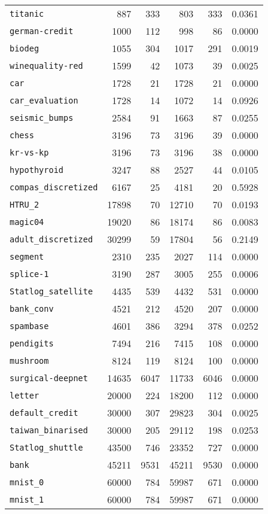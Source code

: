 \begin{tabular}{lrrrrr}
\texttt{titanic}& 887& 333& 803& 333& 0.0361\\
\texttt{german-credit}& 1000& 112& 998& 86& 0.0000\\
\texttt{biodeg}& 1055& 304& 1017& 291& 0.0019\\
\texttt{winequality-red}& 1599& 42& 1073& 39& 0.0025\\
\texttt{car}& 1728& 21& 1728& 21& 0.0000\\
\texttt{car\_evaluation}& 1728& 14& 1072& 14& 0.0926\\
\texttt{seismic\_bumps}& 2584& 91& 1663& 87& 0.0255\\
\texttt{chess}& 3196& 73& 3196& 39& 0.0000\\
\texttt{kr-vs-kp}& 3196& 73& 3196& 38& 0.0000\\
\texttt{hypothyroid}& 3247& 88& 2527& 44& 0.0105\\
\texttt{compas\_discretized}& 6167& 25& 4181& 20& 0.5928\\
\texttt{HTRU\_2}& 17898& 70& 12710& 70& 0.0193\\
\texttt{magic04}& 19020& 86& 18174& 86& 0.0083\\
\texttt{adult\_discretized}& 30299& 59& 17804& 56& 0.2149\\
\texttt{segment}& 2310& 235& 2027& 114& 0.0000\\
\texttt{splice-1}& 3190& 287& 3005& 255& 0.0006\\
\texttt{Statlog\_satellite}& 4435& 539& 4432& 531& 0.0000\\
\texttt{bank\_conv}& 4521& 212& 4520& 207& 0.0000\\
\texttt{spambase}& 4601& 386& 3294& 378& 0.0252\\
\texttt{pendigits}& 7494& 216& 7415& 108& 0.0000\\
\texttt{mushroom}& 8124& 119& 8124& 100& 0.0000\\
\texttt{surgical-deepnet}& 14635& 6047& 11733& 6046& 0.0000\\
\texttt{letter}& 20000& 224& 18200& 112& 0.0000\\
\texttt{default\_credit}& 30000& 307& 29823& 304& 0.0025\\
\texttt{taiwan\_binarised}& 30000& 205& 29112& 198& 0.0253\\
\texttt{Statlog\_shuttle}& 43500& 746& 23352& 727& 0.0000\\
\texttt{bank}& 45211& 9531& 45211& 9530& 0.0000\\
\texttt{mnist\_0}& 60000& 784& 59987& 671& 0.0000\\
\texttt{mnist\_1}& 60000& 784& 59987& 671& 0.0000\\

\end{tabular}
